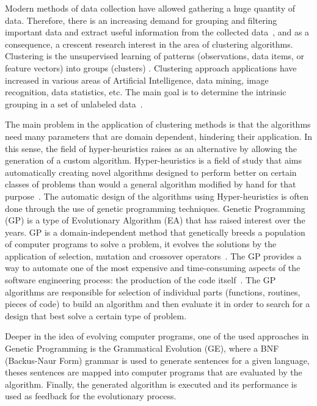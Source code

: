 \documentclass[conference,compsoc]{IEEEtran}
\begin{document}
Modern methods of data collection have allowed gathering a huge quantity of data. Therefore, there is an increasing demand for grouping and filtering important data and extract useful information from the collected data~\cite{ahalya2015data}, and as a consequence, a crescent research interest in the area of clustering algorithms. Clustering is the unsupervised learning of patterns (observations, data items, or feature vectors) into groups (clusters) \cite{jain1988algorithms}. Clustering approach applications have increased in various areas of Artificial Intelligence, data mining, image recognition, data statistics, etc. The main goal is to determine the intrinsic grouping in a set of unlabeled data~\cite{ahalya2015data}.


The main problem in the application of clustering methods is that the algorithms need many parameters that are domain dependent, hindering their application. In this sense, the field of hyper-heuristics raises as an alternative by allowing the generation of a custom algorithm. Hyper-heuristics is a field of study that aims automatically creating novel algorithms designed to perform better on certain classes of problems than would a general algorithm modified by hand for that purpose~\cite{harris2015comparison}. The automatic design of the algorithms using Hyper-heuristics is  often done through the use of genetic programming techniques. Genetic Programming (GP) is a type of Evolutionary Algorithm (EA) that has raised interest over the years. GP is a domain-independent method that genetically breeds a population of computer programs to solve a problem, it evolves the solutions by the application of selection, mutation and crossover operators~\cite{poli2014genetic}. The GP provides a way to automate one of the most expensive and time-consuming aspects of the software engineering process: the production of the code itself~\cite{langdon2015optimising}. The GP algorithms are responsible for selection of individual parts (functions, routines, pieces of code) to build an algorithm and then evaluate it in order to search for a design that best solve a certain type of problem.


Deeper in the idea of evolving computer programs, one of the used approaches in Genetic Programming is the Grammatical Evolution (GE), where a BNF (Backus-Naur Form) grammar is used to generate sentences for a given language, theses sentences are mapped into  computer programs that are evaluated by the algorithm. Finally, the generated algorithm is executed and its performance is used as feedback for the evolutionary process.
\end{document}
